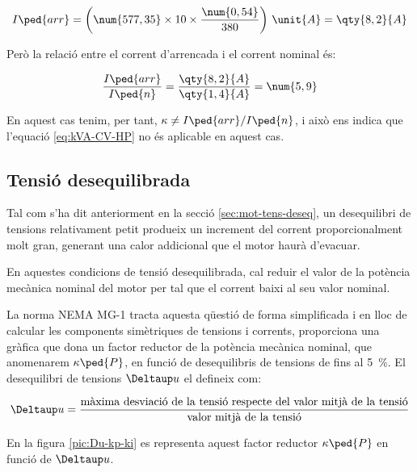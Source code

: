 \begin{exemple}[\MotorArrencNEMA{}]
    \[
      I\ped{arr} = \left(\num{577,35} \times 10 \times \frac{\num{0,54}}{380}\right) \,\unit{A} = \qty{8,2}{A}
    \]

    Però la relació entre el corrent d'arrencada i el corrent nominal és:
    
    \[
        \frac{I\ped{arr}}{I\ped{n}} = \frac{\qty{8,2}{A}}{\qty{1,4}{A}} = \num{5,9}
    \]

    En aquest cas tenim, per tant, $\kappa \neq I\ped{arr}/I\ped{n}$, i això ens indica que l'equació \eqref{eq:kVA-CV-HP} no és aplicable en aquest cas.
\end{exemple}

\subsection{Tensió desequilibrada}\label{sec:NEMA-U-deseq}

Tal com s'ha dit anteriorment en la secció \ref{sec:mot-tens-deseq}, un desequilibri de tensions relativament petit produeix un increment del corrent proporcionalment molt gran, generant una  calor addicional que el motor haurà d'evacuar.

En aquestes condicions de tensió desequilibrada, cal reduir el valor de la potència mecànica nominal del motor per tal que el corrent baixi al seu valor nominal.

La norma NEMA MG-1 tracta aquesta qüestió de forma simplificada i en lloc de calcular les components simètriques de tensions i corrents, proporciona una gràfica que dona un factor reductor de la potència mecànica nominal, que anomenarem $\kappa\ped{P}$, en funció de desequilibris de tensions de fins al \qty{5}{\%}. El desequilibri de tensions $\Deltaup u$ el defineix com:

\begin{equation}
    \Deltaup u = \frac{\text{màxima desviació de la tensió respecte del valor mitjà de la tensió}}{\text{valor mitjà de la tensió}}
\end{equation}

En la figura \vref{pic:Du-kp-ki} es representa aquest factor reductor $\kappa\ped{P}$ en funció de $\Deltaup u$.

\begin{center}
    
    \label{pic:Du-kp-ki}
\end{center}



